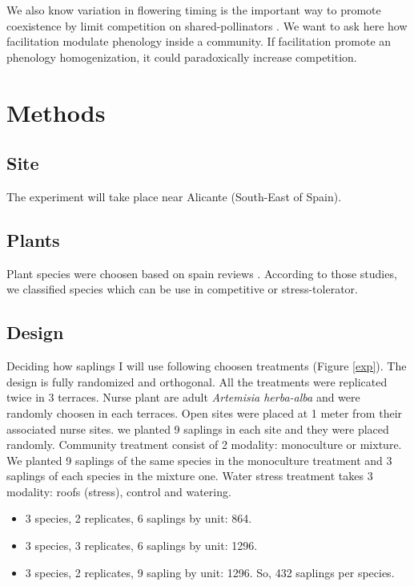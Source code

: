 \documentclass[12pt]{article} %
\begin{document}
We also know variation in flowering timing is the important way to promote coexistence by limit competition on shared-pollinators \citep{Cleland2006}. We want to ask here how facilitation modulate phenology inside a community. If facilitation promote an phenology homogenization, it could paradoxically increase competition. 


\section{Methods}

\subsection{Site}

The experiment will take place near Alicante (South-East of Spain).
\subsection{Plants}

Plant species were choosen based on spain reviews \citep{McCluney2012,Navarro2006, Jauffret2003}. According to those studies, we classified species which can be use in competitive or stress-tolerator. 



\subsection{Design}

Deciding how saplings I will use following choosen treatments (Figure \ref{exp}). The design is fully randomized and orthogonal. All the treatments were replicated twice in 3 terraces. Nurse plant are adult \textit{Artemisia herba-alba} and were randomly choosen in each terraces. Open sites were placed at 1 meter from their associated nurse sites. we planted 9 saplings in each site and they were placed randomly. Community treatment consist of 2 modality: monoculture or mixture. We planted 9 saplings of the same species in the monoculture treatment and 3 saplings of each species in the mixture one. Water stress treatment takes 3 modality: roofs (stress), control and watering.

\begin{itemize}
\item 3 species, 2 replicates, 6 saplings by unit: 864.
\item 3 species, 3 replicates, 6 saplings by unit: 1296.
\item 3 species, 2 replicates, 9 sapling by unit: 1296. So, 432 saplings per species.
\end{itemize}
\end{document}
